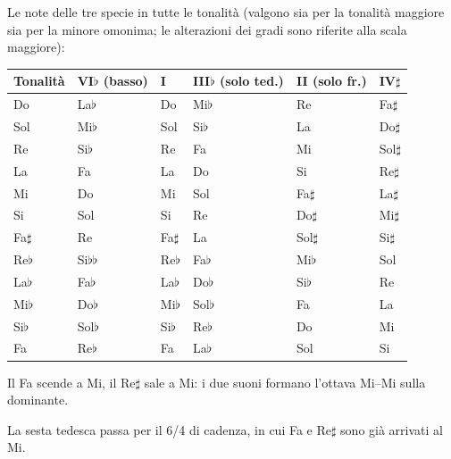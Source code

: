 \begin{esempio}
	\label{ex:seste_costruzione_do}
\end{esempio}

Le note delle tre specie in tutte le tonalità (valgono sia per la tonalità maggiore sia per la minore omonima; le alterazioni dei gradi sono riferite alla scala maggiore):

\begin{center}
\small
\begin{tabularx}{\linewidth}{lLLLLL}
\toprule
\textbf{Tonalità} & \textbf{VI$\flat$ (basso)} & \textbf{I} & \textbf{III$\flat$ (solo ted.)} & \textbf{II (solo fr.)} & \textbf{IV$\sharp$} \\
\midrule
Do & La$\flat$ & Do & Mi$\flat$ & Re & Fa$\sharp$ \\
Sol & Mi$\flat$ & Sol & Si$\flat$ & La & Do$\sharp$ \\
Re & Si$\flat$ & Re & Fa & Mi & Sol$\sharp$ \\
La & Fa & La & Do & Si & Re$\sharp$ \\
Mi & Do & Mi & Sol & Fa$\sharp$ & La$\sharp$ \\
Si & Sol & Si & Re & Do$\sharp$ & Mi$\sharp$ \\
Fa$\sharp$ & Re & Fa$\sharp$ & La & Sol$\sharp$ & Si$\sharp$ \\
Re$\flat$ & Si$\flat\flat$ & Re$\flat$ & Fa$\flat$ & Mi$\flat$ & Sol \\
La$\flat$ & Fa$\flat$ & La$\flat$ & Do$\flat$ & Si$\flat$ & Re \\
Mi$\flat$ & Do$\flat$ & Mi$\flat$ & Sol$\flat$ & Fa & La \\
Si$\flat$ & Sol$\flat$ & Si$\flat$ & Re$\flat$ & Do & Mi \\
Fa & Re$\flat$ & Fa & La$\flat$ & Sol & Si \\
\bottomrule
\end{tabularx}
\end{center}

\begin{esempio}
	\label{ex:italiana_francese_minore}
	Il Fa scende a Mi, il Re$\sharp$ sale a Mi: i due suoni formano l'ottava Mi--Mi sulla dominante.
\end{esempio}

\begin{esempio}
	\label{ex:tedesca_minore}
	La sesta tedesca passa per il 6/4 di cadenza, in cui Fa e Re$\sharp$ sono già arrivati al Mi.
\end{esempio}

